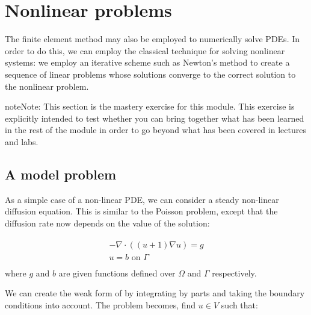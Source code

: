 \documentclass{book}
\begin{document}
\chapter{Nonlinear problems}
\label{\detokenize{8_nonlinear_problems::doc}}\label{\detokenize{8_nonlinear_problems:nonlinear-problems}}
The finite element method may also be employed to numerically solve
 PDEs. In order to do this, we can employ the classical
technique for solving nonlinear systems: we employ an iterative scheme
such as Newton’s method to create a sequence of linear problems whose
solutions converge to the correct solution to the
nonlinear problem.

\begin{sphinxadmonition}{note}{Note:}
This section is the mastery exercise for this module. This exercise
is explicitly intended to test whether you can bring together what
has been learned in the rest of the module in order to go beyond
what has been covered in lectures and labs.
\end{sphinxadmonition}


\section{A model problem}
\label{\detokenize{8_nonlinear_problems:a-model-problem}}
As a simple case of a non-linear PDE, we can consider a steady
non-linear diffusion equation. This is similar to the Poisson problem,
except that the diffusion rate now depends on the value of the
solution:

\label{\detokenize{8_nonlinear_problems:equation-diffusion}}\begin{align}\label{equation:8_nonlinear_problems:diffusion}\!\begin{aligned}
-\nabla\cdot\left((u+1)\nabla u\right) = g\\
u = b \textrm{ on } \Gamma\\
\end{aligned}\end{align}
where \(g\) and \(b\) are given functions defined over \(\Omega\) and
\(\Gamma\) respectively.

We can create the weak form of {\hyperref[\detokenize{8_nonlinear_problems:equation-diffusion}]{}} by integrating by parts
and taking the boundary conditions into account. The problem becomes,
find \(u\in V\) such that:
\end{document}
